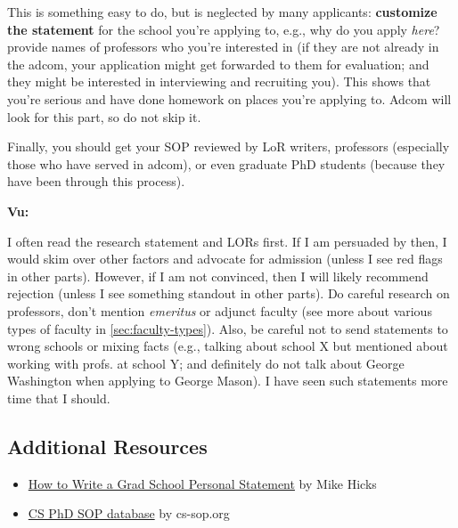 \documentclass[oneside,11pt]{memoir}
\newenvironment{commentbox}[1][]{
  \small
  \begin{mybox}
    {\small \textbf{#1}}
  }{
  \end{mybox}
}
\begin{document}

This is something easy to do, but is neglected by many
applicants: \textbf{customize the statement} for the school you're applying to,
e.g., why do you apply \emph{here}? provide names of professors who you're interested in (if they are not already in the adcom, your application might get forwarded to them for evaluation; and they might be interested in interviewing and recruiting you).
This shows that you're serious and have done homework on places you're applying to.
Adcom will look for this part, so do not skip it.

Finally, you should get your SOP reviewed by LoR writers, professors (especially those who have served in adcom), or even graduate PhD students (because they have been through this process).  

\begin{commentbox}[Vu:]
  I often read the research statement and LORs first. If I am
  persuaded by then, I would skim over other factors and advocate for
  admission (unless I see red flags in other parts). However, if I am not
  convinced, then I will likely recommend rejection (unless I see
  something standout in other parts).
  \tcblower
  Do careful research on professors, don't mention \emph{emeritus} or  adjunct faculty (see more about various types of faculty in \autoref{sec:faculty-types}).
  Also, be careful not to send statements to wrong schools or mixing
  facts (e.g., talking about school X but mentioned about working with
  profs. at school Y; and definitely do not talk about George Washington when applying to George Mason). I have seen such statements more time that I
  should.
\end{commentbox}




\subsection*{Additional Resources}
\begin{itemize}
  \item \href{http://www.pl-enthusiast.net/2022/10/03/how-to-write-a-grad-school-personal-statement/}{How to Write a Grad School Personal Statement} by Mike Hicks
  \item     \href{https://cs-sop.notion.site/cs-sop/CS-PhD-Statements-of-Purpose-df39955313834889b7ac5411c37b958d?p=f5d5980a71524ebaa4e6ae57266b847c&pm=s}{CS PhD SOP database} by cs-sop.org
\end{itemize}
\end{document}
